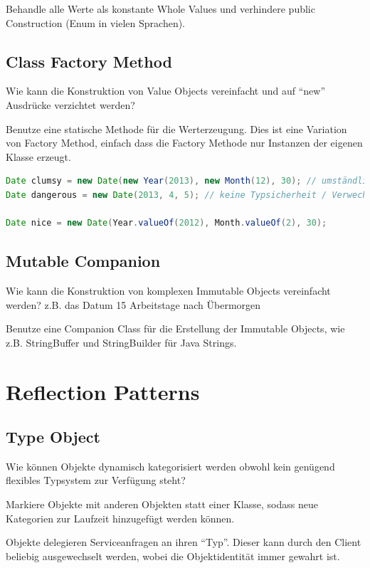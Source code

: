 Behandle alle Werte als konstante Whole Values und verhindere public Construction (Enum in vielen Sprachen).

\subsection{Class Factory Method}

Wie kann die Konstruktion von Value Objects vereinfacht und auf ``new'' Ausdrücke verzichtet werden?

Benutze eine statische Methode für die Werterzeugung. Dies ist eine Variation von Factory Method, einfach dass die Factory Methode nur Instanzen der eigenen Klasse erzeugt.

\begin{lstlisting}[language=Java, caption={Class Factory Method}]
Date clumsy = new Date(new Year(2013), new Month(12), 30); // umständlich, keine Möglichkeit um Values wiederzuverwenden
Date dangerous = new Date(2013, 4, 5); // keine Typsicherheit / Verwechslungsgefahr

Date nice = new Date(Year.valueOf(2012), Month.valueOf(2), 30);
\end{lstlisting}

\subsection{Mutable Companion}

Wie kann die Konstruktion von komplexen Immutable Objects vereinfacht werden? z.B. das Datum 15 Arbeitstage nach Übermorgen

Benutze eine Companion Class für die Erstellung der Immutable Objects, wie z.B. StringBuffer und StringBuilder für Java Strings.


\section{Reflection Patterns}

\subsection{Type Object}

Wie können Objekte dynamisch kategorisiert werden obwohl kein genügend flexibles Typsystem zur Verfügung steht?

Markiere Objekte mit anderen Objekten statt einer Klasse, sodass neue Kategorien zur Laufzeit hinzugefügt werden können.

Objekte delegieren Serviceanfragen an ihren ``Typ''. Dieser kann durch den Client beliebig ausgewechselt werden, wobei die Objektidentität immer gewahrt ist.

